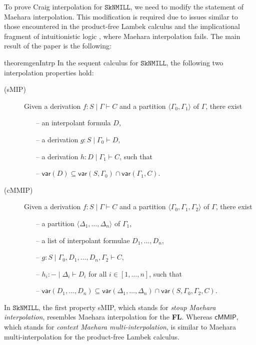 \documentclass[sn-mathphys-num]{sn-jnl}%
\newcommand{\GG}{\Gamma}
\newcommand{\GD}{\Delta}
\newcommand{\vd}{\vdash}
\newcommand{\SkNMILL}{$\mathtt{SkNMILL}$}
\newcommand{\mf}[1]{\mathsf{#1}}
\newcommand{\vars}[1]{\mf{var} (#1)}
\newcommand{\FL}{\textbf{FL}}
\newcommand{\sMIP}{\textsf{sMIP}}
\newcommand{\cMMIP}{\textsf{cMMIP}}
\theoremstyle{thmstyleone}%
\theoremstyle{thmstyletwo}%
\theoremstyle{thmstylethree}%
\begin{document}
To prove Craig interpolation for \SkNMILL, we need to modify the statement of Maehara interpolation.
This modification is required due to issues similar to those encountered in the product-free Lambek calculus \cite{Pentus1997} and the implicational fragment of intuitionistic logic \cite{Kanazawa2006}, where Maehara interpolation fails. The main result of the paper is the following:
\begin{restatable*}{theorem}{genIntrp}\label{genIntrp}
  In the sequent calculus for \SkNMILL, the following two interpolation properties hold:
  \begin{description}
    \item[(\sMIP)] Given a derivation $f: S \mid \GG \vd C$ and a partition $\langle \GG_0,\GG_1 \rangle$ of $\GG$, there exist
    \begin{itemize}
      \item[--] an interpolant formula $D$,
      \item[--] a derivation $g : S \mid \GG_0 \vd D$,
      \item[--] a derivation $h : D \mid \GG_1 \vd C$, such that
      \item[--] $\vars{D} \subseteq \vars{S , \GG_0} \cap \vars{\GG_1 , C}$.
    \end{itemize}
    \item[(\cMMIP)] Given a derivation $f: S \mid \GG \vd C$ and a partition $\langle \GG_0,\GG_1, \GG_2 \rangle$ of $\GG$, there exist  
    \begin{itemize}
      \item[--] a partition $\langle \GD_1, \dots, \GD_n \rangle$ of $\GG_1$,
      \item[--] a list of interpolant formulae $D_1, \dots, D_n$,
      \item[--] $g: S \mid \GG_0, D_1, \dots, D_n, \GG_2 \vd C$,
      \item[--] $h_i : {-} \mid \GD_i \vd D_i$ for  all $i \in [1, \dots, n]$, such that
      \item[--] $\vars{D_1, \dots, D_n} \subseteq \vars{\GD_1, \dots, \GD_n} \cap \vars{S, \GG_0, \GG_2, C}$.
    \end{itemize}
  \end{description}
\end{restatable*}
In \SkNMILL, the first property \sMIP, which stands for \emph{stoup Maehara interpolation}, resembles Maehara interpolation for the \FL. Whereas $\cMMIP$, which stands for \emph{context Maehara multi-interpolation}, is similar to Maehara multi-interpolation for the product-free Lambek calculus. %
\end{document}
